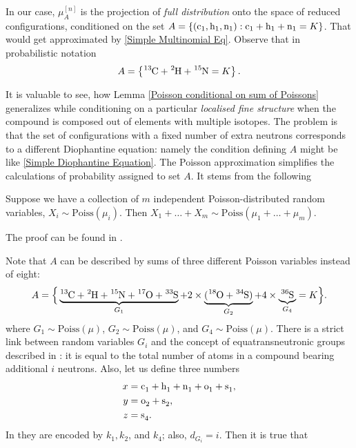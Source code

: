 In our case, $\mu^{[n]}_A$ is the projection of {\it full distribution} onto the space of reduced configurations, conditioned on the set $A = \left\{ ( \cem{c}_1, \cem{h}_1, \cem{n}_1 ) :  \cem{c}_1 + \cem{h}_1 + \cem{n}_1 = K\right\}$. That would get approximated by \eqref{Simple Multinomial Eq}. Observe that in probabilistic notation
$$ A =  \left\{ \cem{^{13}C} + \cem{^2H} + \cem{^{15}N} = K \right\}.$$  


It is valuable to see, how Lemma \ref{Poisson conditional on sum of Poissons} generalizes while conditioning on a particular {\it localised fine structure} when the compound is composed out of elements with multiple isotopes. The problem is that the set of configurations with a fixed number of extra neutrons corresponds to a different Diophantine equation: namely the condition defining $A$ might be like \eqref{Simple Diophantine Equation}. The Poisson approximation simplifies the calculations of probability assigned to set $A$. It stems from the following


\begin{lemma}\label{sum of independent Poissons lemma}
	Suppose we have a collection of $m$ independent Poisson-distributed random variables, $X_i \sim \mathrm{Poiss}(\mu_i)$. Then $X_1 + \dots + X_m \sim \mathrm{Poiss}(\mu_1 + \dots + \mu_m)$. 
\end{lemma}  
The proof can be found in \cite{Kingman1993PoissonProcesses}. 


Note that $A$ can be described by sums of three different Poisson variables instead of eight:
\begin{equation}\label{setA}
	A = \Big\{ \underbrace{\cem{^{13}C} + \cem{^2H} + \cem{^{15}N} + \cem{^{17}O} + \cem{^{33}S}}_{ G_1 } + 2 \times \underbrace{( \cem{^{18}O} + \cem{^{34}S} )}_{ G_2 } + 4 \times \underbrace{\cem{^{36}S}}_{ G_4 } = K \Big\}.	
\end{equation}
where $G_1 \sim \mathrm{Poiss}(\mu)$, $G_2 \sim \mathrm{Poiss}(\mu)$, and $G_4 \sim \mathrm{Poiss}(\mu)$. There is a strict link between random variables $G_i$ and the concept of equatransneutronic groups described in \cite{Olson2009Calculations}: it is equal to the total number of atoms in a compound bearing additional $i$ neutrons. Also, let us define three numbers
\begin{align*}
	x 	& = \cem{c_1} + \cem{h_1} + \cem{n_1} + \cem{o_1} + \cem{s_1}, \\	  	
	y 	& = \cem{o_2} + \cem{s_2}, 	\\
	z 	& = \cem{s_4}.
\end{align*}
In \cite{Olson2009Calculations} they are encoded by $k_1, k_2$, and $k_4$; also, $d_{G_i} = i$. Then it is true that

